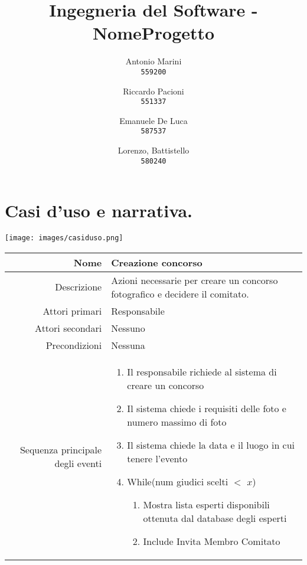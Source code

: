 \documentclass{article}
\title{Ingegneria del Software - NomeProgetto}
\author{
  Antonio Marini\\
  \texttt{559200}
  \and
  Riccardo Pacioni\\
  \texttt{551337}
  \and
  Emanuele De Luca\\
  \texttt{587537}
  \and
  Lorenzo, Battistello\\
  \texttt{580240}
}
\begin{document}
\maketitle

\newpage

\section{Casi d'uso e narrativa.}

\texttt{[image: images/casiduso.png]}

\begin{center}
    \begin{tabular}{ |r|p{9cm}| }
        \hline
        Nome                              & Creazione concorso                                                           \\
        \hline
        Descrizione                       & Azioni necessarie per creare un concorso fotografico e decidere il comitato. \\
        \hline
        Attori primari                    & Responsabile                                                                 \\
        \hline
        Attori secondari                  & Nessuno                                                                      \\
        \hline
        Precondizioni                     & Nessuna                                                                      \\
        \hline
        Sequenza principale degli eventi  &
        \begin{enumerate}
            \item Il responsabile richiede al sistema di creare un concorso
            \item Il sistema chiede i requisiti delle foto e numero massimo di foto
            \item Il sistema chiede la data e il luogo in cui tenere l’evento
            \item While(num giudici scelti $<$ $x$)
                  \begin{enumerate}
                      \item Mostra lista esperti disponibili ottenuta dal database degli esperti
                      \item Include Invita Membro Comitato
                  \end{enumerate}
        \end{enumerate}

\end{tabular}
\end{center}
\end{document}

